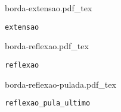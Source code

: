 \begin{subfigure}{0.33\textwidth}
    \centering
    \def\svgwidth{4cm}
    {borda-extensao.pdf_tex}

    \caption{\texttt{extensao}}
    \label{fig:borda:extensao}
\end{subfigure}%
\begin{subfigure}{0.33\textwidth}
    \centering
    \def\svgwidth{4cm}
    {borda-reflexao.pdf_tex}
    \caption{\texttt{reflexao}}
    \label{fig:borda:reflexao}
\end{subfigure}%
\begin{subfigure}{0.33\textwidth}
    \centering
    \def\svgwidth{4cm}
    {borda-reflexao-pulada.pdf_tex}
    \caption{\texttt{reflexao_pula_ultimo}}
    \label{fig:borda:reflexao-pulada}
\end{subfigure}